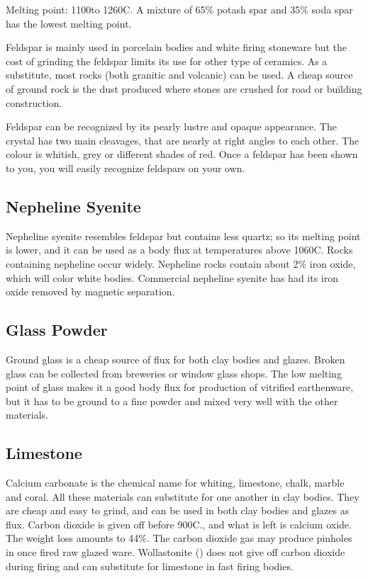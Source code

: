 Melting point: 1100\degree to 1260\degree C. A mixture of 65\% potash spar and 
35\% soda spar has the lowest melting point.

Feldspar is mainly used in porcelain bodies and white firing stoneware but the 
cost of grinding the feldspar limits its use for other type of ceramics. As a 
substitute, most rocks (both granitic and volcanic) can be used. A cheap source 
of ground rock is the dust produced where stones are crushed for road or 
building construction.

Feldspar can be recognized by its pearly lustre and opaque appearance. The 
crystal has two main cleavages, that are nearly at right angles to each other. 
The colour is whitish, grey or different shades of red. Once a feldspar has 
been shown to you, you will easily recognize feldspars on your own.
\subsection{Nepheline Syenite}
Nepheline syenite resembles feldspar but contains less quartz; so its melting 
point is lower, and it can be used as a body flux at temperatures above 
1060\degree C. Rocks containing nepheline occur widely. Nepheline rocks contain 
about 2\% iron oxide, which will color white bodies. Commercial nepheline 
syenite has had its iron oxide removed by magnetic separation.
\subsection{Glass Powder}
Ground glass is a cheap source of flux for both clay bodies and glazes. Broken 
glass can be collected from breweries or window glass shops. The low melting 
point of glass makes it a good body flux for production of vitrified 
earthenware, but it has to be ground to a fine powder and mixed very well with 
the other materials.
\subsection{Limestone}
Calcium carbonate is the chemical name for whiting, limestone, chalk, marble 
and coral. All these materials can substitute for one another in clay bodies. 
They are cheap and easy to grind, and can be used in both clay bodies and 
glazes as flux. Carbon dioxide is given off before 900\degree C., and what is 
left is calcium oxide. The weight loss amounts to 44\%. The carbon dioxide gas 
may produce pinholes in once fired raw glazed ware. Wollastonite 
() does not give off carbon dioxide during firing and can 
substitute for limestone in fast firing bodies.

